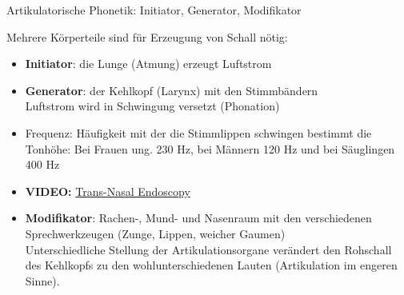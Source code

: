 \begin{frame}{Artikulatorische Phonetik: Initiator, Generator, Modifikator}

Mehrere Körperteile sind für Erzeugung von Schall nötig:
		
		\begin{itemize}
			\item \textbf{Initiator}: die Lunge \ras (Atmung) erzeugt Luftstrom
			\item \textbf{Generator}: der Kehlkopf (Larynx) mit den Stimmbändern \ras\\
                              Luftstrom wird in Schwingung versetzt (Phonation)

			\item[] Frequenz: Häufigkeit mit der die Stimmlippen schwingen bestimmt die Tonhöhe:
			        Bei Frauen ung. 230 Hz, bei Männern 120 Hz und bei Säuglingen 400 Hz
			

			\item[] \textbf{VIDEO:} \href{run:material/04TransNasalEndoscopy.mp4}{Trans-Nasal Endoscopy}

		        \item \textbf{Modifikator}: Rachen-, Mund- und Nasenraum mit den verschiedenen
                  Sprechwerkzeugen (Zunge, Lippen, weicher Gaumen) \ras\\
                  Unterschiedliche Stellung der Artikulationsorgane verändert den Rohschall des Kehlkopfs zu den wohlunterschiedenen Lauten (Artikulation im engeren Sinne).
	\end{itemize}

                
	
\end{frame}




	
